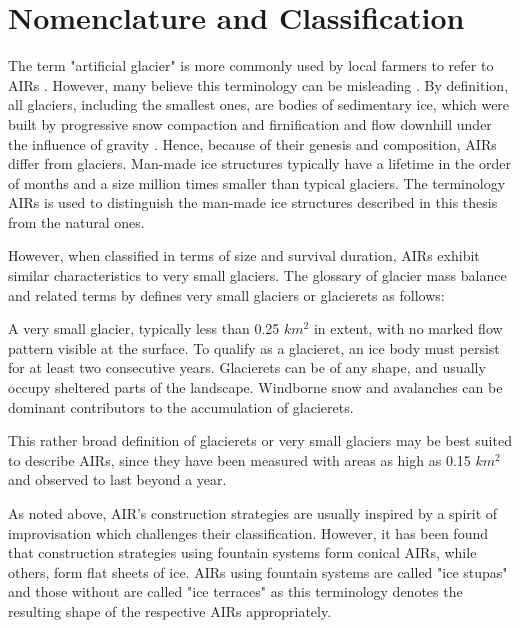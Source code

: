\section{Nomenclature and Classification}

The term "artificial glacier" is more commonly used by local farmers to refer to \ac{AIRs}
\citep{norphelArtificialGlacierHigh2009}. However, many believe this terminology can be misleading
\citep{nusserSociohydrologyArtificialGlaciers2019}. By definition, all glaciers, including the smallest ones,
are bodies of sedimentary ice, which were built by progressive snow compaction and firnification and flow
downhill under the influence of gravity \citep{benndouglasGlaciersGlaciation2014}. Hence, because of their
genesis and composition, \ac{AIRs} differ from glaciers. Man-made ice structures typically have a lifetime in
the order of months and a size million times smaller than typical glaciers. The terminology \ac{AIRs} is used to
distinguish the man-made ice structures described in this thesis from the natural ones.

However, when classified in terms of size and survival duration, \ac{AIRs} exhibit similar characteristics to
very small glaciers. The glossary of glacier mass balance and related terms by
\citet{cogleyGlossaryGlacierMass2010} defines very small glaciers or glacierets as follows:

\begin{thesis_quotation}
	A very small glacier, typically less than 0.25 $km^2$ in extent, with no marked flow pattern
	visible at the surface. To qualify as a glacieret, an ice body must persist for at least two consecutive
	years. Glacierets can be of any shape, and usually occupy sheltered parts of the landscape. Windborne snow and
	avalanches can be dominant contributors to the accumulation of glacierets.
\end{thesis_quotation}

This rather broad definition of glacierets or very small glaciers may be best suited to describe AIRs, since
they have been measured with areas as high as 0.15 $km^2$ \citep{nusserSociohydrologyArtificialGlaciers2019} and
observed to last beyond a year.

As noted above, AIR's construction strategies are usually inspired by a spirit of improvisation which challenges
their classification. However, it has been found that construction strategies using fountain systems form
conical \ac{AIRs}, while others, form flat sheets of ice. \ac{AIRs} using fountain systems are called
"ice stupas" and those without are called "ice terraces" as this terminology denotes the resulting shape of the
respective \ac{AIRs} appropriately.

